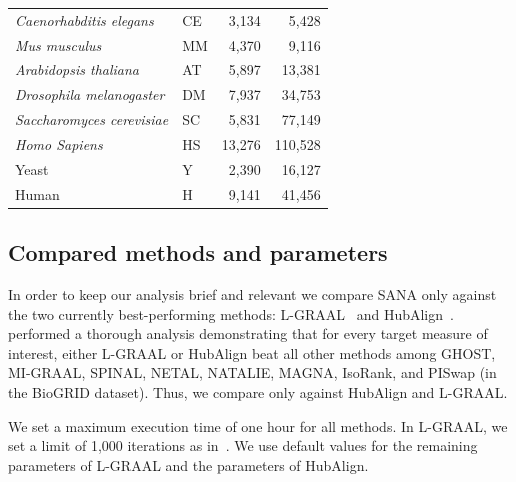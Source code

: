 \documentclass{bioinfo}
\begin{document}
\begin{table}[h]
\begin{tabular}{llrr}
\textit{Caenorhabditis elegans}    & CE                  & 3,134                                 & 5,428                                     \\
\textit{Mus musculus}              & MM                  & 4,370                                 & 9,116                                     \\
\textit{Arabidopsis thaliana}      & AT                  & 5,897                                 & 13,381                                    \\
\textit{Drosophila melanogaster}   & DM                  & 7,937                                 & 34,753                                    \\
\textit{Saccharomyces cerevisiae}      & SC                  & 5,831                                 & 77,149                                    \\
\textit{Homo Sapiens}   & HS                  & 13,276                                 & 110,528                                   \\ \hline
Yeast                              & Y                   & 2,390                                 & 16,127                                    \\
Human                              & H                   & 9,141                                 & 41,456                                    \\ \hline
\end{tabular}
\end{table}

\subsection{Compared methods and parameters}

In order to keep our analysis brief and relevant we compare SANA only against the two currently best-performing methods: L-GRAAL~\citep{LGRAAL} and HubAlign~\citep{HubAlign}. \cite{LGRAAL} performed a thorough analysis demonstrating that for every target measure of interest, either L-GRAAL or HubAlign beat all other methods among GHOST, MI-GRAAL, SPINAL, NETAL, NATALIE, MAGNA, IsoRank, and PISwap (in the BioGRID dataset). Thus, we compare only against HubAlign and L-GRAAL.

We set a maximum execution time of one hour for all methods. In L-GRAAL, we set a limit of 1,000 iterations as in~\citep{LGRAAL}. We use default values for the remaining parameters of L-GRAAL and the parameters of HubAlign.
\end{document}
